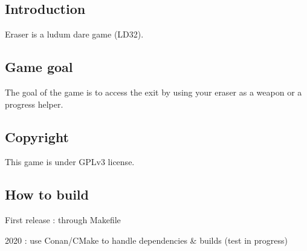 \subsection*{Introduction}

Eraser is a ludum dare game (L\+D32).

\subsection*{Game goal}

The goal of the game is to access the exit by using your eraser as a weapon or a progress helper.

\subsection*{Copyright}

This game is under G\+P\+Lv3 license.

\subsection*{How to build}

First release \+: through Makefile

2020 \+: use Conan/\+C\+Make to handle dependencies \& builds (test in progress) 